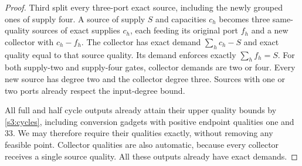 \begin{proof}
Third split every three-port exact source, including the newly grouped
ones of supply four. A source of supply $S$ and capacities $c_h$ becomes
three same-quality sources of exact supplies $c_h$, each feeding its
original port $f_h$ and a new collector with $c_h-f_h$. The collector
has exact demand $\sum_hc_h-S$ and exact quality equal to that source
quality. Its demand enforces exactly $\sum_hf_h=S$. For both supply-two
and supply-four gates, collector demands are two or four. Every new
source has degree two and the collector degree three. Sources with one
or two ports already respect the input-degree bound.

All full and half cycle outputs already attain their upper quality
bounds by \cref{s3:cycles}, including conversion gadgets with positive
endpoint qualities one and 33. We may therefore require their qualities
exactly, without removing any feasible point. Collector qualities are
also automatic, because every collector receives a single source
quality. All these outputs already have exact demands.


\end{proof}
